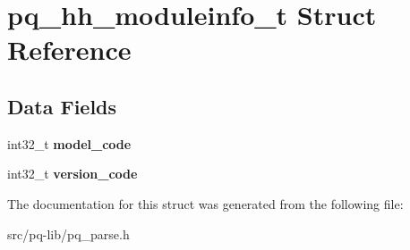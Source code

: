 \hypertarget{structpq__hh__moduleinfo__t}{}\section{pq\+\_\+hh\+\_\+moduleinfo\+\_\+t Struct Reference}
\label{structpq__hh__moduleinfo__t}
\subsection*{Data Fields}
\begin{DoxyCompactItemize}
\item 
\hypertarget{structpq__hh__moduleinfo__t_a531bdb1b1c54b9731c42e1681c4d967d}{}int32\+\_\+t {\bfseries model\+\_\+code}\label{structpq__hh__moduleinfo__t_a531bdb1b1c54b9731c42e1681c4d967d}

\item 
\hypertarget{structpq__hh__moduleinfo__t_a4e9e201edd509ab31e802cf94d5031e7}{}int32\+\_\+t {\bfseries version\+\_\+code}\label{structpq__hh__moduleinfo__t_a4e9e201edd509ab31e802cf94d5031e7}

\end{DoxyCompactItemize}


The documentation for this struct was generated from the following file\+:\begin{DoxyCompactItemize}
\item 
src/pq-\/lib/pq\+\_\+parse.\+h\end{DoxyCompactItemize}
